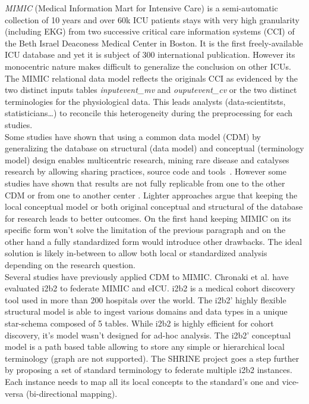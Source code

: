 \emph{MIMIC} (Medical Information Mart for Intensive Care) is a semi-automatic
collection of 10 years and over 60k ICU patients stays with very high
granularity (including EKG) from two successive critical care information
systems (CCI) of the Beth Israel Deaconess Medical Center in Boston. It is the
first freely-available ICU database and yet it is subject of 300 international
publication. However its monocentric nature makes difficult to generalize the
conclusion on other ICUs. The MIMIC relational data model reflects the originals
CCI as evidenced by the two distinct inputs tables \textit{inputevent\_mv} and
\textit{ouputevent\_cv} \cite{mimic-nature} or the two distinct terminologies
for the physiological data. This leads analysts (data-scientitsts,
statisticians\ldots) to reconcile this heterogeneity during the preprocessing
for each studies.
\\

Some studies have shown that using a common data model (CDM) by generalizing
the database on structural (data model) and conceptual (terminology model)
design enables multicentric research, mining rare disease and catalyses
research by allowing sharing practices, source code and
tools \cite{cdm-review,data-enclave}. 
However some studies have shown that results are not fully replicable from one
to the other CDM \cite{cdm-comparison} or from one to another center
\cite{omop-replicability}. Lighter approaches argue that keeping the local
conceptual model \cite{fhir-deep} or both original conceptual and structural
\cite{imi-protect} of the database for research leads to better outcomes. On
the first hand keeping MIMIC on its specific form won't solve the limitation of
the previous paragraph and on the other hand a fully standardized form would
introduce other drawbacks. The ideal solution is likely in-between to allow
both local or standardized analysis depending on the research question.
\\

Several studies have previously applied CDM to MIMIC. Chronaki et al.
\cite{mimic-i2b2} have evaluated i2b2 to federate MIMIC and eICU. i2b2 is a
medical cohort discovery tool used in more than 200 hospitals over the world.
The i2b2' highly flexible structural model is able to ingest various domains
and data types in a unique star-schema composed of 5 tables. While i2b2 is
highly efficient for cohort discovery, it's model wasn't designed for ad-hoc
analysis.
The i2b2' conceptual model is a path based table allowing to store any simple
or hierarchical local terminology (graph are not supported). The SHRINE project
goes a step further by proposing a set of standard terminology to federate
multiple i2b2 instances. Each instance needs to map all its local concepts to
the standard's one and vice-versa \cite{shrine-design} (bi-directional
mapping).

